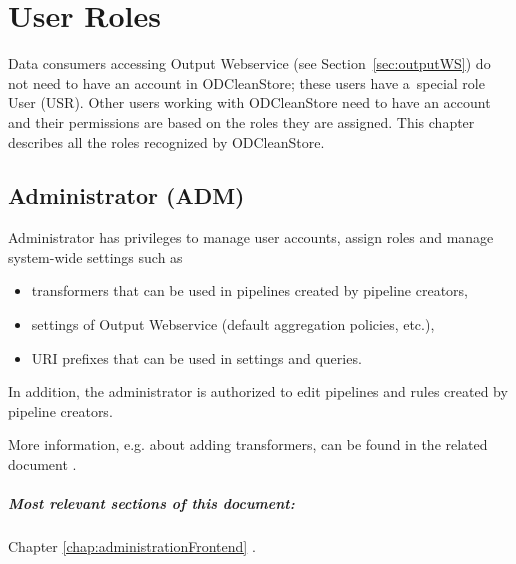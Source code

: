 
\chapter{User Roles}
\label{chap:userRoles}


Data consumers accessing Output Webservice (see Section~\ref{sec:outputWS}) do not need to have an account in ODCleanStore; these users have a~special role User (USR). Other users working with ODCleanStore need to have an account and their permissions are based on the roles they are assigned. This chapter describes all the roles recognized by ODCleanStore.

\section[Administrator]{Administrator (ADM)}
\label{sec:adm}

	Administrator has privileges to manage user accounts, assign roles and manage system-wide settings such as
	\begin{itemize}
		\item transformers that can be used in pipelines created by pipeline creators,
		\item settings of Output Webservice (default aggregation policies, etc.),
		\item URI prefixes that can be used in settings and queries.
	\end{itemize}

	In addition, the administrator is authorized to edit pipelines and rules created by pipeline creators.



	More information, e.g. about adding transformers, can be found in the related document .

	\paragraph{Most relevant sections of this document:} Chapter \ref{chap:administrationFrontend} .

